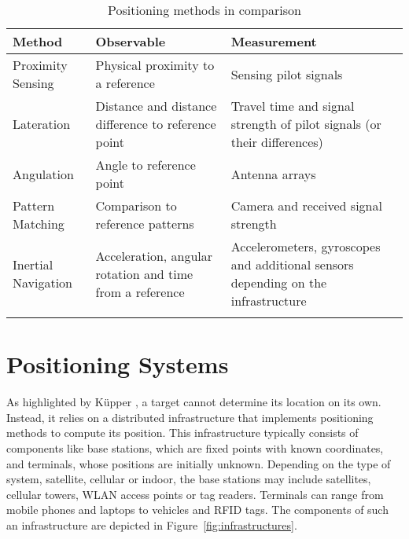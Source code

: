 \begin{table}[h!]
    \begin{center}
    \caption{Positioning methods in comparison}
    \label{tab:table_methods}
    \begin{tabular}{>{\centering\arraybackslash}p{4cm} >{\centering\arraybackslash}p{4cm} >{\centering\arraybackslash}p{5cm}}
        \toprule
        \textbf{Method} & \textbf{Observable} & \textbf{Measurement} \\
        \midrule
        Proximity Sensing & Physical proximity to a reference & Sensing pilot signals \\
        \addlinespace
        \hline
        \addlinespace
        Lateration & Distance and distance difference to reference point & Travel time and signal strength of pilot signals (or their differences) \\
        \addlinespace
        \hline
        \addlinespace
        Angulation & Angle to reference point & Antenna arrays \\
        \addlinespace
        \hline
        \addlinespace
        Pattern Matching & Comparison to reference patterns & Camera and received signal strength \\
        \addlinespace
        \hline
        \addlinespace
        Inertial Navigation & Acceleration, angular rotation and time from a reference & Accelerometers, gyroscopes and additional sensors depending on the infrastructure \\
        \addlinespace
        \bottomrule
    \end{tabular}
    \end{center}
\end{table}

\section{Positioning Systems}
As highlighted by K\"upper \cite{kupper2005location}, a target cannot determine its location on its own. 
Instead, it relies on a distributed infrastructure that implements positioning methods to compute its position. 
This infrastructure typically consists of components like base stations, which are fixed points with known coordinates, and terminals, whose positions are initially unknown. 
Depending on the type of system, satellite, cellular or indoor, the base stations may include satellites, cellular towers, \ac{WLAN} access points or tag readers. 
Terminals can range from mobile phones and laptops to vehicles and \ac{RFID} tags.
The components of such an infrastructure are depicted in Figure~\ref{fig:infrastructures}.

